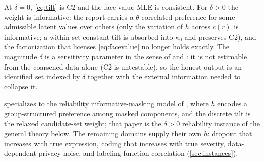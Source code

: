 At $\delta = 0$, \eqref{eq:tilt} is C2 and the face-value MLE is consistent. For
$\delta > 0$ the weight is informative: the report carries a $\theta$-correlated
preference for some admissible latent values over others (only the variation of
$h$ across $c(r)$ is informative; a within-set-constant tilt is absorbed into
$\kappa_0$ and preserves C2), and the factorization that licenses
\eqref{eq:facevalue} no longer holds exactly. The magnitude $\delta$
is a sensitivity parameter in the sense of \citet{copas1997inference} and
\citet{manski1989anatomy}: it is not estimable from the coarsened data alone (C2 is
untestable), so the honest output is an identified set indexed by $\delta$ together
with the external information needed to collapse it.

 specializes to the reliability informative-masking model of
\citet{towell2026mdrelax}, where $h$ encodes a group-structured preference among
masked components, and the discrete tilt is the relaxed candidate-set weight; that
paper is the $\delta > 0$ reliability instance of the general theory below. The
remaining domains supply their own $h$: dropout that increases with true
expression, coding that increases with true severity, data-dependent privacy noise,
and labeling-function correlation (\cref{sec:instances}).
